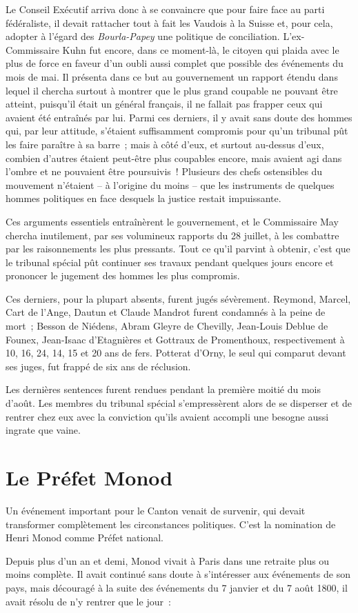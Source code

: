 \documentclass[french,twoside]{book} %
\begin{document}
Le Conseil Exécutif arriva donc à se convaincre que pour faire face au parti fédéraliste, il devait rattacher tout à fait les Vaudois à la Suisse et, pour cela, adopter à l’égard des \emph{Bourla-Papey} une politique de conciliation. L’ex-Commissaire Kuhn fut encore, dans ce moment-là, le citoyen qui plaida avec le plus de force en faveur d’un oubli aussi complet que possible des événements du mois de mai. Il présenta dans ce but au gouvernement un rapport étendu dans lequel il chercha surtout à montrer que le plus grand coupable ne pouvant être atteint, puisqu’il était un général français, il ne fallait pas frapper ceux qui avaient été entraînés par lui. Parmi ces derniers, il y avait sans doute des hommes qui, par leur attitude, s’étaient suffisamment compromis pour qu’un tribunal pût les faire paraître à sa barre ; mais à côté d’eux, et surtout au-dessus d’eux, combien d’autres étaient peut-être plus coupables encore, mais avaient agi dans l’ombre et ne pouvaient être poursuivis ! Plusieurs des chefs ostensibles du mouvement n’étaient – à l’origine du moins – que les instruments de quelques hommes politiques en face desquels la justice restait impuissante.\par
Ces arguments essentiels entraînèrent le gouvernement, et le Commissaire May chercha inutilement, par ses volumineux rapports du 28 juillet, à les combattre par les raisonnements les plus pressants. Tout ce qu’il parvint à obtenir, c’est que le tribunal spécial pût continuer ses travaux pendant quelques jours encore et prononcer le jugement des hommes les plus compromis.\par
Ces derniers, pour la plupart absents, furent jugés sévèrement. Reymond, Marcel, Cart de l’Ange, Dautun et Claude Mandrot furent condamnés à la peine de mort ; Besson de Niédens, Abram Gleyre de Chevilly, Jean-Louis Deblue de Founex, Jean-Isaac d’Etagnières et Gottraux de Promenthoux, respectivement à 10, 16, 24, 14, 15 et 20 ans de fers. Potterat d’Orny, le seul qui comparut devant ses juges, fut frappé de six ans de réclusion.\par
Les dernières sentences furent rendues pendant la première moitié du mois d’août. Les membres du tribunal spécial s’empressèrent alors de se disperser et de rentrer chez eux avec la conviction qu’ils avaient accompli une besogne aussi ingrate que vaine.
\section[{Le Préfet Monod}]{Le Préfet Monod}
\noindent Un événement important pour le Canton venait de survenir, qui devait transformer complètement les circonstances politiques. C’est la nomination de Henri Monod comme Préfet national.\par
Depuis plus d’un an et demi, Monod vivait à Paris dans une retraite plus ou moins complète. Il avait continué sans doute à s’intéresser aux événements de son pays, mais découragé à la suite des événements du 7 janvier et du 7 août 1800, il avait résolu de n’y rentrer que le jour :\par
\end{document}
